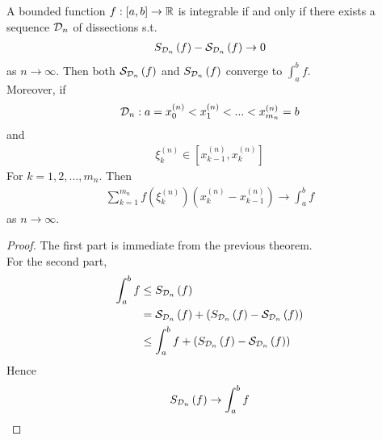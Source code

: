 \documentclass[a4paper]{article}
\begin{document}
\begin{coro}
A bounded function $f:\left[a,b\right]\to\mathbb{R}$ is integrable if and only if there exists a sequence $\mathcal{D}_n$ of dissections s.t.
\begin{equation*}
\begin{aligned}
S_{\mathcal{D}_n} \left(f\right) - \mathcal{S}_{\mathcal{D}_n} \left(f\right) \to 0
\end{aligned}
\end{equation*}
as $n\to\infty$. Then both $\mathcal{S}_{\mathcal{D}_n}\left(f\right)$ and $S_{\mathcal{D}_n}\left(f\right)$ converge to $\int_a^b f$.\\
Moreover, if
\begin{equation*}
\begin{aligned}
\mathcal{D}_n: a = x_0^{\left(n\right)}<x_1^{\left(n\right)}<...<x_{m_n}^{\left(n\right)}=b
\end{aligned}
\end{equation*}
and
\begin{equation*}
\begin{aligned}
\xi_k^{\left(n\right)} \in \left[x_{k-1}^{\left(n\right)},x_k^{\left(n\right)}\right]
\end{aligned}
\end{equation*}
For $k=1,2,...,m_n$. Then
\begin{equation*}
\begin{aligned}
\sum_{k=1}^{m_n} f\left(\xi_k^{\left(n\right)}\right)\left(x_k^{\left(n\right)}-x_{k-1}^{\left(n\right)}\right) \to \int_a^b f
\end{aligned}
\end{equation*}
as $n\to\infty$.
\begin{proof}
The first part is immediate from the previous theorem.\\
For the second part,
\begin{equation*}
\begin{aligned}
\int_a^b f &\leq S_{\mathcal{D}_n}\left(f\right)\\
&= \mathcal{S}_{\mathcal{D}_n} \left(f\right) + \left(S_{\mathcal{D}_n} \left(f\right) - \mathcal{S}_{\mathcal{D}_n}\left(f\right)\right)\\
&\leq \int_a^b f + \left(S_{\mathcal{D}_n} \left(f\right) - \mathcal{S}_{\mathcal{D}_n}\left(f\right)\right)
\end{aligned}
\end{equation*}
Hence
\begin{equation*}
\begin{aligned}
S_{\mathcal{D}_n}\left(f\right) \to \int_a^b f
\end{aligned}
\end{equation*}

\end{proof}
\end{coro}
\end{document}

